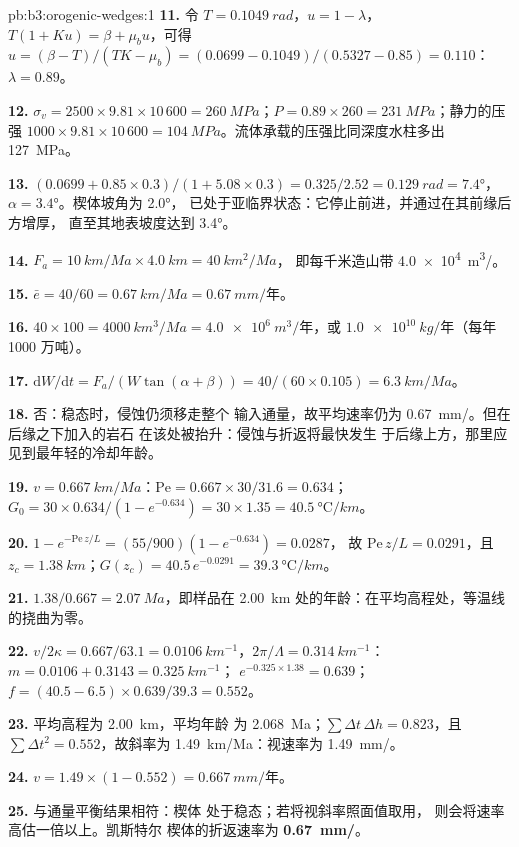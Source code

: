 \begin{solution}{pb:b3:orogenic-wedges:1}
\textbf{11.} 令 $T = \qty{0.1049}{rad}$，$u = 1 - \lambda$，$T(1 + Ku) =
\beta + \mu_bu$，可得 $u = (\beta - T)/(TK - \mu_b) = (0.0699 -
0.1049)/(0.5327 - 0.85) = 0.110$：$\lambda = 0.89$。

\textbf{12.} $\sigma_v = 2500\times9.81\times10\,600 = \qty{260}{MPa}$；$P =
0.89\times260 = \qty{231}{MPa}$；静力的压强 $1000\times9.81\times10\,600 =
\qty{104}{MPa}$。流体承载的压强比同深度水柱多出
\qty{127}{MPa}。

\textbf{13.} $(0.0699 + 0.85\times0.3)/(1 + 5.08\times0.3) = 0.325/2.52 =
\qty{0.129}{rad} = \ang{7.4}$，$\alpha = \ang{3.4}$。楔体坡角为 \ang{2.0}，
已处于亚临界状态：它停止前进，并通过在其前缘后方增厚，
直至其地表坡度达到 \ang{3.4}。

\textbf{14.} $F_a = \qty{10}{km/Ma}\times\qty{4.0}{km} = \qty{40}{km^2/Ma}$，
即每千米造山带 \qty{4.0e4}{m^3/}。

\textbf{15.} $\bar e = 40/60 = \qty{0.67}{km/Ma} = \qty{0.67}{mm/\text{年}}$。

\textbf{16.} $40\times100 = \qty{4000}{km^3/Ma} = \qty{4.0e6}{m^3/\text{年}}$，或
$\qty{1.0e10}{kg/\text{年}}$（每年 1000 万吨）。

\textbf{17.} $\mathrm dW/\mathrm dt = F_a/(W\tan(\alpha + \beta)) =
40/(60\times0.105) = \qty{6.3}{km/Ma}$。

\textbf{18.} 否：稳态时，侵蚀仍须移走整个
输入通量，故平均速率仍为 \qty{0.67}{mm/}。但在后缘之下加入的岩石
在该处被抬升：侵蚀与折返将最快发生
于后缘上方，那里应见到最年轻的冷却年龄。

\textbf{19.} $v = \qty{0.667}{km/Ma}$：$\mathrm{Pe} = 0.667\times30/31.6 =
0.634$；$G_0 = 30\times0.634/(1 - e^{-0.634}) = 30\times1.35 =
\qty{40.5}{\celsius/km}$。

\textbf{20.} $1 - e^{-\mathrm{Pe}\,z/L} = (55/900)(1 - e^{-0.634}) = 0.0287$，
故 $\mathrm{Pe}\,z/L = 0.0291$，且 $z_c = \qty{1.38}{km}$；$G(z_c) =
40.5\,e^{-0.0291} = \qty{39.3}{\celsius/km}$。

\textbf{21.} $1.38/0.667 = \qty{2.07}{Ma}$，即样品在
\qty{2.00}{km} 处的年龄：在平均高程处，等温线的挠曲为零。

\textbf{22.} $v/2\kappa = 0.667/63.1 = \qty{0.0106}{km^{-1}}$，$2\pi/\Lambda =
\qty{0.314}{km^{-1}}$：$m = 0.0106 + 0.3143 = \qty{0.325}{km^{-1}}$；
$e^{-0.325\times1.38} = 0.639$；$f = (40.5 - 6.5)\times0.639/39.3 = 0.552$。

\textbf{23.} 平均高程为 \qty{2.00}{km}，平均年龄
为 \qty{2.068}{Ma}；$\sum\Delta t\,\Delta h = 0.823$，且 $\sum\Delta t^2 =
0.552$，故斜率为 \qty{1.49}{km/Ma}：视速率为
\qty{1.49}{mm/}。

\textbf{24.} $v = 1.49\times(1 - 0.552) = \qty{0.667}{mm/\text{年}}$。

\textbf{25.} 与通量平衡结果相符：楔体
处于稳态；若将视斜率照面值取用，
则会将速率高估一倍以上。凯斯特尔
楔体的折返速率为 \textbf{\qty[text-series-to-math=true]{0.67}{mm/}}。
\end{solution}
